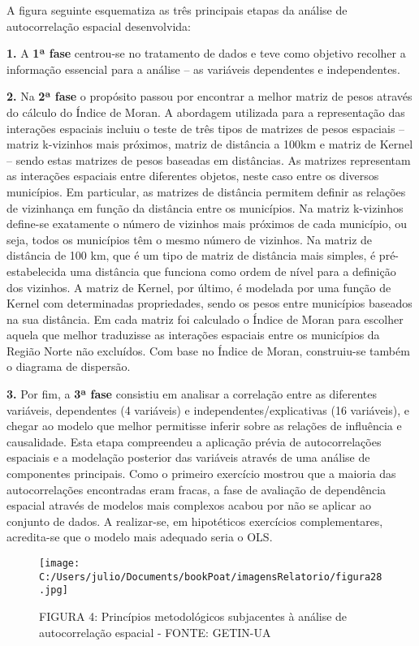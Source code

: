 \documentclass[
]{book}
\begin{document}
A figura seguinte esquematiza as três principais etapas da análise de autocorrelação espacial desenvolvida:

\textbf{1.} A \textbf{1ª fase} centrou-se no tratamento de dados e teve como objetivo recolher a informação essencial para a análise -- as variáveis dependentes e independentes.

\textbf{2.} Na \textbf{2ª fase} o propósito passou por encontrar a melhor matriz de pesos através do cálculo do Índice de Moran. A abordagem utilizada para a representação das interações espaciais incluiu o teste de três tipos de matrizes de pesos espaciais -- matriz k-vizinhos mais próximos, matriz de distância a 100km e matriz de Kernel -- sendo estas matrizes de pesos baseadas em distâncias. As matrizes representam as interações espaciais entre diferentes objetos, neste caso entre os diversos municípios. Em particular, as matrizes de distância permitem definir as relações de vizinhança em função da distância entre os municípios.
Na matriz k-vizinhos define-se exatamente o número de vizinhos mais próximos de cada município, ou seja, todos os municípios têm o mesmo número de vizinhos. Na matriz de distância de 100 km, que é um tipo de matriz de distância mais simples, é pré-estabelecida uma distância que funciona como ordem de nível para a definição dos vizinhos. A matriz de Kernel, por último, é modelada por uma função de Kernel com determinadas propriedades, sendo os pesos entre municípios baseados na sua distância. Em cada matriz foi calculado o Índice de Moran para escolher aquela que melhor traduzisse as interações espaciais entre os municípios da Região Norte não excluídos. Com base no Índice de Moran, construiu-se também o diagrama de dispersão.

\textbf{3.} Por fim, a \textbf{3ª fase} consistiu em analisar a correlação entre as diferentes variáveis, dependentes (4 variáveis) e independentes/explicativas (16 variáveis), e chegar ao modelo que melhor permitisse inferir sobre as relações de influência e causalidade. Esta etapa compreendeu a aplicação prévia de autocorrelações espaciais e a modelação posterior das variáveis através de uma análise de componentes principais. Como o primeiro exercício mostrou que a maioria das autocorrelações encontradas eram fracas, a fase de avaliação de dependência espacial através de modelos mais complexos acabou por não se aplicar ao conjunto de dados. A realizar-se, em hipotéticos exercícios complementares, acredita-se que o modelo mais adequado seria o OLS.

\begin{figure}
\centering
\texttt{[image: C:/Users/julio/Documents/bookPoat/imagensRelatorio/figura28.jpg]}
\caption{FIGURA 4: Princípios metodológicos subjacentes à análise de autocorrelação espacial - FONTE: GETIN-UA}
\end{figure}
\end{document}
